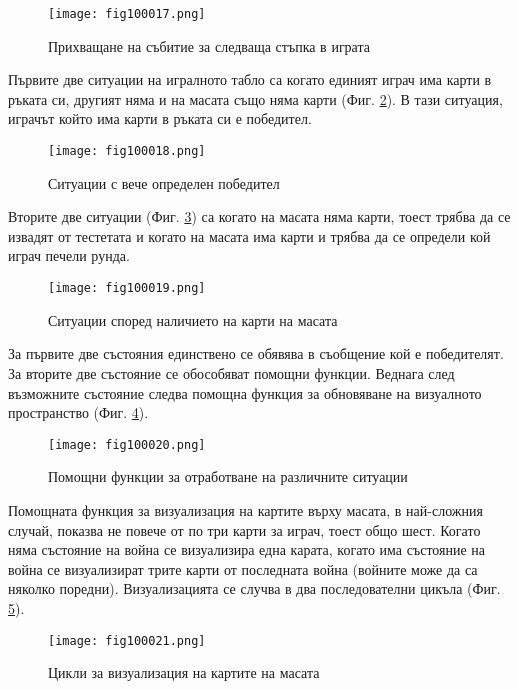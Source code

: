 \begin{figure}[H]
  \centering
  \texttt{[image: fig100017.png]}
  \caption{Прихващане на събитие за следваща стъпка в играта}
\label{fig100017}
\end{figure}

Първите две ситуации на игралното табло са когато единият играч има карти в ръката си, другият няма и на масата също няма карти (Фиг. \ref{fig100018}). В тази ситуация, играчът който има карти в ръката си е победител.

\begin{figure}[H]
  \centering
  \texttt{[image: fig100018.png]}
  \caption{Ситуации с вече определен победител}
\label{fig100018}
\end{figure}

Вторите две ситуации (Фиг. \ref{fig100019}) са когато на масата няма карти, тоест трябва да се извадят от тестетата и когато на масата има карти и трябва да се определи кой играч печели рунда.

\begin{figure}[H]
  \centering
  \texttt{[image: fig100019.png]}
  \caption{Ситуации според наличието на карти на масата}
\label{fig100019}
\end{figure}

За първите две състояния единствено се обявява в съобщение кой е победителят. За вторите две състояние се обособяват помощни функции. Веднага след възможните състояние следва помощна функция за обновяване на визуалното пространство (Фиг. \ref{fig100020}).

\begin{figure}[H]
  \centering
  \texttt{[image: fig100020.png]}
  \caption{Помощни функции за отработване на различните ситуации}
\label{fig100020}
\end{figure}

Помощната функция за визуализация на картите върху масата, в най-сложния случай, показва не повече от по три карти за играч, тоест общо шест. Когато няма състояние на война се визуализира една карата, когато има състояние на война се визуализират трите карти от последната война (войните може да са няколко поредни). Визуализацията се случва в два последователни цикъла (Фиг. \ref{fig100021}).

\begin{figure}[H]
  \centering
  \texttt{[image: fig100021.png]}
  \caption{Цикли за визуализация на картите на масата}
\label{fig100021}
\end{figure}

